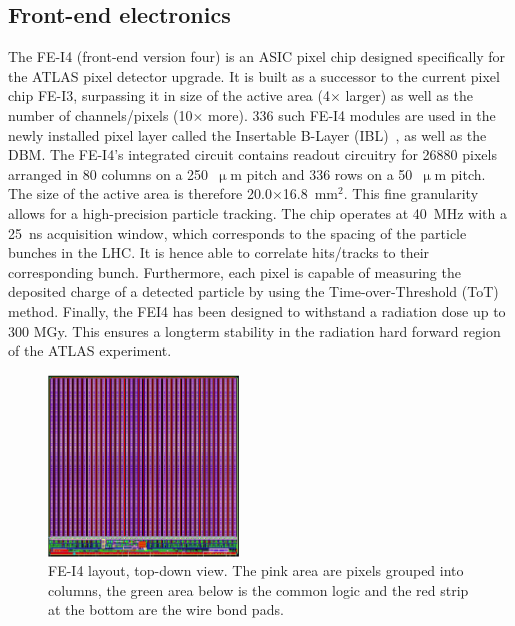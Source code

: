 \documentclass[12pt]{packages/mytustyle}  %
\begin{document}
\subsection{Front-end electronics}
The FE-I4 (front-end version four) is an ASIC pixel chip designed specifically for the ATLAS pixel detector upgrade. It is built as a successor to the current pixel chip FE-I3, surpassing it in size of the active area (4$\times$ larger) as well as the number of channels/pixels (10$\times$ more). 336 such FE-I4 modules are used in the newly installed pixel layer called the Insertable B-Layer (IBL)~\cite{}, as well as the DBM. The FE-I4's integrated circuit contains readout circuitry for 26880 pixels arranged in 80 columns on a 250~$\upmu$m pitch and 336 rows on a 50~$\upmu$m pitch. The size of the active area is therefore 20.0$\times$16.8~mm$^2$. This fine granularity allows for a high-precision particle tracking. The chip operates at 40~MHz with a 25~ns acquisition window, which corresponds to the spacing of the particle bunches in the LHC. It is hence able to correlate hits/tracks to their corresponding bunch. Furthermore, each pixel is capable of measuring the deposited charge of a detected particle by using the Time-over-Threshold (ToT) method. Finally, the FEI4 has been designed to withstand a radiation dose up to 300 MGy. This ensures a longterm stability in the radiation hard forward region of the ATLAS experiment.

\begin{figure}[!t]
\centering
\includegraphics[width=0.45\textwidth]{pics/fei41}
\caption{FE-I4 layout, top-down view. The pink area are pixels grouped into columns, the green area below is the common logic and the red strip at the bottom are the wire bond pads.}
\label{fig:anapix}
\end{figure}
\end{document}

